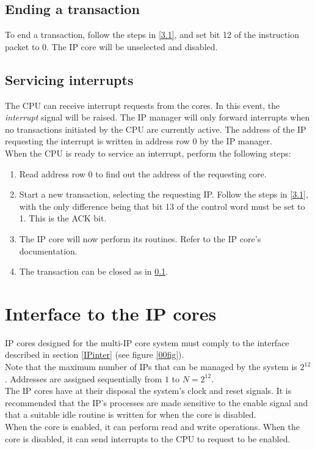 \subsection{Ending a transaction} \label{3.4}
To end a transaction, follow the steps in \ref{3.1}, and set bit 12 of the instruction packet to 0. The IP core will be unselected and disabled.


\subsection{Servicing interrupts} \label{3.5}
The CPU can receive  interrupt requests from the cores. In this event, the \textit{interrupt} signal will be raised. The IP manager will only forward interrupts when no transactions initiated by the CPU are currently active. The address of the IP requesting the interrupt is written in address row 0 by the IP manager.
\vspace{0.5cm}\\
When the CPU is ready to service an interrupt, perform the following steps:
\begin{enumerate}
\item Read address row 0 to find out the address of the requesting core.
\item Start a new transaction, selecting the requesting IP. Follow the steps in \ref{3.1}, with the only difference being that bit 13 of the control word must be set to 1. This is the ACK bit.
\item The IP core will now perform its routines. Refer to the IP core's documentation.
\item The transaction can be closed as in \ref{3.4}.
\end{enumerate}



\section{Interface to the IP cores}\label{4}

IP cores designed for the multi-IP core system must comply to the interface described in section \ref{IPinter} (see figure \ref{00fig}).\\
Note that the maximum number of IPs that can be managed by the system is $ 2^{12} $. Addresses are assigned sequentially from $ 1 $ to $ N = 2^{12} $.\vspace{0.5cm}\\
The IP cores have at their disposal the system's clock and reset signals. It is recommended that the IP's processes are made sensitive to the enable signal and that a suitable idle routine is written for when the core is disabled.\vspace{0.5cm}\\
When the core is enabled, it can perform read and write operations. When the core is disabled, it can send interrupts to the CPU to request to be enabled.


